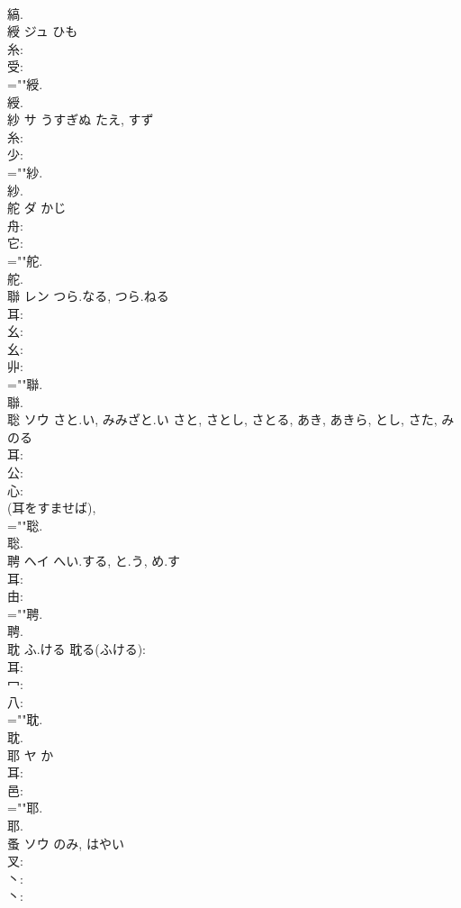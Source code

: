 \documentclass[8pt]{extreport}
\begin{document}
\begin{CJK}{UTF8}{min}
\\	縞.
\\	綬	ジュ	ひも		
\\	糸: 
\\	受: 
\\	=""綬.
\\	綬.
\\	紗	サ	うすぎぬ	たえ, すず	
\\	糸: 
\\	少: 
\\	=""紗.
\\	紗.
\\	舵	ダ	かじ		
\\	舟: 
\\	它: 
\\	=""舵.
\\	舵.
\\	聯	レン	つら.なる, つら.ねる		
\\	耳: 
\\	幺: 
\\	幺: 
\\	丱: 
\\	=""聯.
\\	聯.
\\	聡	ソウ	さと.い, みみざと.い	さと, さとし, さとる, あき, あきら, とし, さた, みのる	
\\	耳: 
\\	公: 
\\	心: 
\\	(耳をすませば), 
\\	=""聡.
\\	聡.
\\	聘	ヘイ	へい.する, と.う, め.す		
\\	耳: 
\\	由: 
\\	=""聘.
\\	聘.
\\	耽		ふ.ける			耽る(ふける): 
\\	耳: 
\\	冖: 
\\	八: 
\\	=""耽.
\\	耽.
\\	耶	ヤ	か		
\\	耳: 
\\	邑: 
\\	=""耶.
\\	耶.
\\	蚤	ソウ	のみ, はやい		
\\	叉: 
\\	丶: 
\\	丶: 

\end{CJK}
\end{document}
